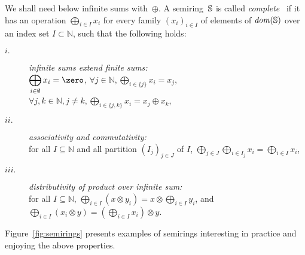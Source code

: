 We shall need below infinite sums with~$\oplus$.
A semiring~$\mathbb{S}$ is called \emph{complete}~\cite{Droste09handbook} 
if it has an %
operation $\bigoplus_{i \in I} x_i$
for every family
$(x_i)_{i \in I}$ %
of elements of $\mathit{dom}(\mathbb{S})$ over an index set $I \subset \mathbb{N}$, such that
the following holds: %
\begin{description}
\item[$i.$]
\emph{infinite sums extend finite sums:}\\
$\displaystyle\bigoplus_{i \in \emptyset} x_i = \zero$,\quad 
      $\forall j\in \mathbb{N}, \displaystyle\bigoplus_{i \in \{ j \}} x_i = x_j$,
      $\forall j, k\in \mathbb{N}, j\neq k, 
      \displaystyle\bigoplus_{i \in \{ j, k \}} x_i = x_j \oplus x_k$,
%
\item[$ii.$]
\emph{associativity and commutativity:}\\
for all $I \subseteq \mathbb{N}$
and all partition $(I_{j})_{j \in J}$ of $I$, %
\(
\displaystyle
\bigoplus_{j \in J}\bigoplus_{i \in I_j} x_i = 
\bigoplus_{i \in I} x_i
\),
%
\item[$iii.$] 
\emph{distributivity of product over infinite sum:}\\
for all $I \subseteq \mathbb{N}$,
\(
\displaystyle
\bigoplus_{i \in I} (x \otimes y_i) = x \otimes \bigoplus_{i\in I} y_i\), and
\(
\displaystyle
\bigoplus_{i \in I} (x_i \otimes y) = (\bigoplus_{i \in I} x_i ) \otimes y\).
\end{description}



\begin{example}
Figure~\ref{fig:semirings} presents examples of semirings interesting in practice 
and enjoying the above properties.
\end{example}


